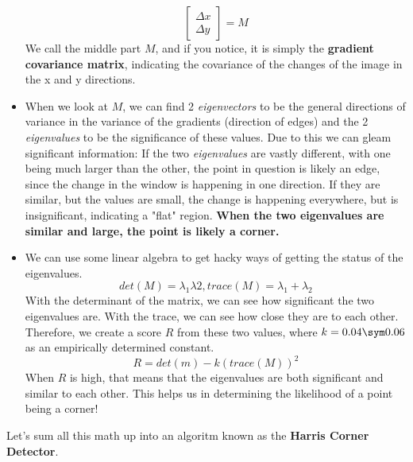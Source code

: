 \documentclass{article}
\begin{document}
\begin{itemize}
$$\begin{bmatrix}
    \Delta x \\
    \Delta y
    \end{bmatrix} = M
    $$
    We call the middle part $M$, and if you notice, it is simply the \textbf{gradient covariance matrix}, indicating the covariance of the changes of the image in the x and y directions.
    \item When we look at $M$, we can find 2 \textit{eigenvectors} to be the general directions of variance in the variance of the gradients (direction of edges) and the 2 \textit{eigenvalues} to be the significance of these values. Due to this we can gleam significant information: If the two \textit{eigenvalues} are vastly different, with one being much larger than the other, the point in question is likely an edge, since the change in the window is happening in one direction. If they are similar, but the values are small, the change is happening everywhere, but is insignificant, indicating a "flat" region. \textbf{When the two eigenvalues are similar and large, the point is likely a corner.}
    \item We can use some linear algebra to get hacky ways of getting the status of the eigenvalues. 
    $$det(M) = \lambda_1\lambda2, trace(M) = \lambda_1 + \lambda_2$$
    With the determinant of the matrix, we can see how significant the two eigenvalues are. With the trace, we can see how close they are to each other. Therefore, we create a score $R$ from these two values, where $k = 0.04 \sym 0.06$ as an empirically determined constant.
    $$R = det(m) - k(trace(M))^2$$
    When $R$ is high, that means that the eigenvalues are both significant and similar to each other. This helps us in determining the likelihood of a point being a corner!
\end{itemize}
Let's sum all this math up into an algoritm known as the \textbf{Harris Corner Detector}. 
\end{document}
